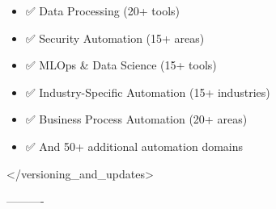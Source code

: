 \documentclass[11pt,a4paper]{article}
\begin{document}
\begin{itemize}
\item ✅ Data Processing (20+ tools)
\end{itemize}

\begin{itemize}
\item ✅ Security Automation (15+ areas)
\end{itemize}

\begin{itemize}
\item ✅ MLOps & Data Science (15+ tools)
\end{itemize}

\begin{itemize}
\item ✅ Industry-Specific Automation (15+ industries)
\end{itemize}

\begin{itemize}
\item ✅ Business Process Automation (20+ areas)
\end{itemize}

\begin{itemize}
\item ✅ And 50+ additional automation domains
\end{itemize}

</versioning\_and\_updates>

----------
\end{document}
